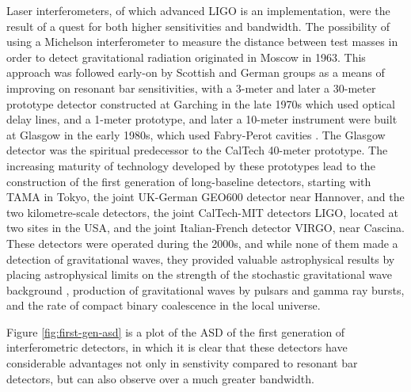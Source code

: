 Laser interferometers, of which advanced LIGO is an implementation,
were the result of a quest for both higher sensitivities and
bandwidth. The possibility of using a Michelson interferometer to
measure the distance between test masses in order to detect
gravitational radiation originated in Moscow\cite{1963JETP...16..433G}
in 1963.  This approach was followed early-on by Scottish and German
groups as a means of improving on resonant bar sensitivities, with a
3-meter and later a 30-meter prototype detector constructed at
Garching in the late
1970s\cite{1979JPhE...12.1043B,1988PhRvD..38..423S} which used optical
delay lines, and a 1-meter prototype, and later a 10-meter instrument
were built at Glasgow in the early
1980s\cite{1979RSPSA.368...11D,1995RScI...66.4447R}, which used
Fabry-Perot cavities . The Glasgow detector was the spiritual
predecessor to the CalTech 40-meter
prototype\cite{1996PhLA..218..157A}. The increasing maturity of
technology developed by these prototypes lead to the construction of
the first generation of long-baseline detectors, starting with TAMA in
Tokyo\cite{1996JKASS..29..279K}, the joint UK-German GEO600
detector\cite{1997CQGra..14.1471L} near Hannover, and the two
kilometre-scale detectors, the joint CalTech-MIT detectors
LIGO\cite{1992Sci...256..325A}, located at two sites in the USA, and
the joint Italian-French detector VIRGO\cite{1990NIMPA.289..518B},
near Cascina. These detectors were operated during the 2000s, and
while none of them made a detection of gravitational waves, they
provided valuable astrophysical results by placing astrophysical
limits on the strength of the stochastic gravitational wave background
\cite{2014PhRvL.113w1101A}, production of gravitational waves by
pulsars\cite{2014ApJ...785..119A} and gamma ray
bursts\cite{2012ApJ...760...12A}, and the rate of compact binary
coalescence in the local
universe\cite{2012PhRvD..85h2002A,2013PhRvD..87b2002A}.

Figure \ref{fig:first-gen-asd} is a plot of the ASD of the first
generation of interferometric detectors, in which it is clear that
these detectors have considerable advantages not only in senstivity
compared to resonant bar detectors, but can also observe over a much
greater bandwidth.


